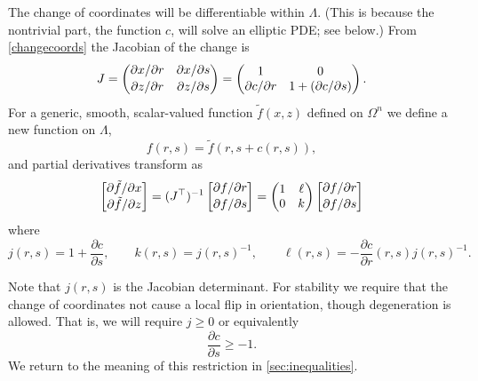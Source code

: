 \documentclass[letterpaper,final,12pt,reqno]{amsart}
\begin{document}
The change of coordinates will be differentiable within $\Lambda$.  (This is because the nontrivial part, the function $c$, will solve an elliptic PDE; see below.)  From \eqref{changecoords} the Jacobian of the change is
\begin{equation}
J = \begin{pmatrix} \partial x / \partial r & \partial x / \partial s \\ {\large\strut} \partial z / \partial r & \partial z / \partial s \end{pmatrix} = \begin{pmatrix} 1 & 0 \\ \partial c/\partial r & 1+(\partial c/\partial s) \end{pmatrix}. \label{jacchange}
\end{equation}
For a generic, smooth, scalar-valued function $\tilde f(x,z)$ defined on $\Omega^n$ we define a new function on $\Lambda$,
    $$f(r,s) = \tilde f(r,s+c(r,s)),$$
and partial derivatives transform as
\begin{equation}
\begin{bmatrix} \partial \tilde f / \partial x \\ {\large\strut} \partial \tilde f / \partial z\end{bmatrix} = (J^\top)^{-1} \begin{bmatrix} \partial f / \partial r \\ {\large\strut} \partial f / \partial s\end{bmatrix} = \begin{pmatrix} 1 & \ell \\ 0 & k \end{pmatrix} \begin{bmatrix} \partial f / \partial r \\ {\large\strut} \partial f / \partial s\end{bmatrix} \label{changederivatives}
\end{equation}
where
\begin{equation}
j(r,s) = 1+\frac{\partial c}{\partial s}, \qquad k(r,s) = j(r,s)^{-1}, \qquad \ell(r,s) = - \frac{\partial c}{\partial r}(r,s) j(r,s)^{-1}. \label{definejkl}
\end{equation}

Note that $j(r,s)$ is the Jacobian determinant.  For stability we require that the change of coordinates not cause a local flip in orientation, though degeneration is allowed.  That is, we will require $j\ge 0$ or equivalently
\begin{equation}
\frac{\partial c}{\partial s} \ge -1. \label{differentialVI}
\end{equation}
We return to the meaning of this restriction in \ref{sec:inequalities}.
\end{document}
